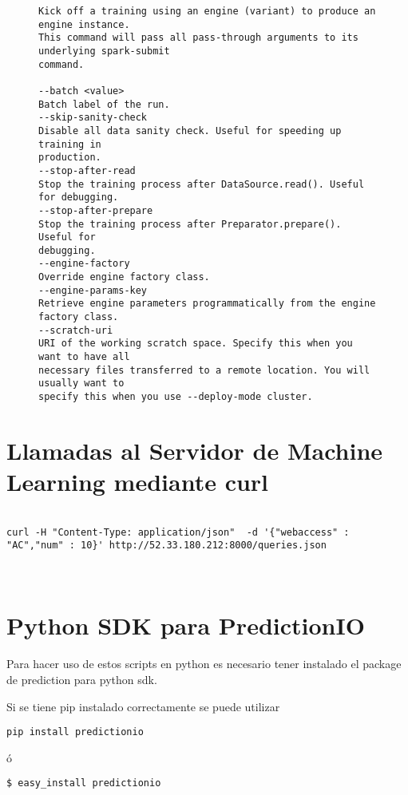 \begin{figure}[t]
\begin{lstlisting}[frame=single,basicstyle=\ttfamily\tiny,]
Kick off a training using an engine (variant) to produce an engine instance.
This command will pass all pass-through arguments to its underlying spark-submit
command.

--batch <value>
Batch label of the run.
--skip-sanity-check
Disable all data sanity check. Useful for speeding up training in
production.
--stop-after-read
Stop the training process after DataSource.read(). Useful for debugging.
--stop-after-prepare
Stop the training process after Preparator.prepare(). Useful for
debugging.
--engine-factory
Override engine factory class.
--engine-params-key
Retrieve engine parameters programmatically from the engine factory class.
--scratch-uri
URI of the working scratch space. Specify this when you want to have all
necessary files transferred to a remote location. You will usually want to
specify this when you use --deploy-mode cluster.

\end{lstlisting}
	
	
	

\end{figure}


\vspace{1cm}


\section {Llamadas al Servidor de Machine Learning mediante curl }


\begin{lstlisting}

curl -H "Content-Type: application/json"  -d '{"webaccess" : "AC","num" : 10}' http://52.33.180.212:8000/queries.json



\end{lstlisting}



\section{Python SDK para PredictionIO}

Para hacer uso de estos scripts en python es necesario tener instalado el package de prediction para python sdk.

Si se tiene pip instalado correctamente se puede utilizar

\begin{verbatim}
pip install predictionio
\end{verbatim}
ó
\begin{verbatim}
$ easy_install predictionio
\end{verbatim}


